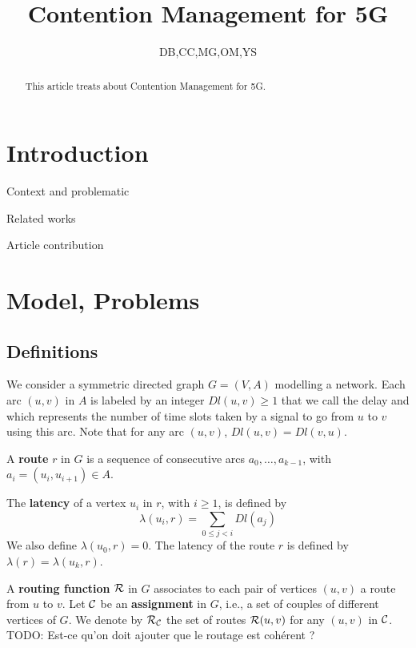 \documentclass[a4paper,10pt]{article}
\title{Contention Management for 5G}
\author{DB,CC,MG,OM,YS}
\newcommand{\todo}[1]{{\color{red} TODO: {#1}}}
\begin{document}
\maketitle

\begin{abstract}
This article treats about Contention Management for 5G.
\end{abstract}

\section{Introduction}
  \itemize
    \item Context and problematic
    \item Related works
    \item Article contribution

\section{Model, Problems}

  \subsection{Definitions}
  
	We consider a symmetric directed graph $G=(V,A)$ modelling a network. Each arc  $(u,v)$ in $A$ is labeled by an integer $Dl(u,v) \geq 1$ that we call the delay and
	which represents the number of time slots taken by a signal to go from $u$ to $v$ using this arc. Note that for any arc $(u,v)$, $Dl(u,v)=Dl(v,u)$.
	
      A {\bf route} $r$ in $G$ is a sequence of consecutive arcs $a_0, \ldots , a_{k-1}$, with $a_i=(u_i,u_{i+1}) \in A$. 
      
      The {\bf latency} of a vertex $u_i$ in $r$, with $i \geq 1$, is defined by $$\lambda(u_i,r)= \sum\limits_{0 \leq j <i} Dl(a_j)$$ We also define $\lambda(u_0,r)=0$.
      The latency of the route $r$ is defined by $\lambda (r)= \lambda (u_k,r)$.
      
      A {\bf routing function} $\cal R$ in $G$ associates to each pair of vertices $(u,v)$ a route from $u$ to $v$. Let $\cal C$ be an {\bf assignment} in $G$, i.e., a set of couples of different vertices of $G$. We denote by $\cal R_{\cal C}$ the set of routes ${\cal R}(u,v)$ for any $(u,v)$ in $\cal C$. \todo{Est-ce qu'on doit ajouter que le routage est cohérent ?}
\end{document}
